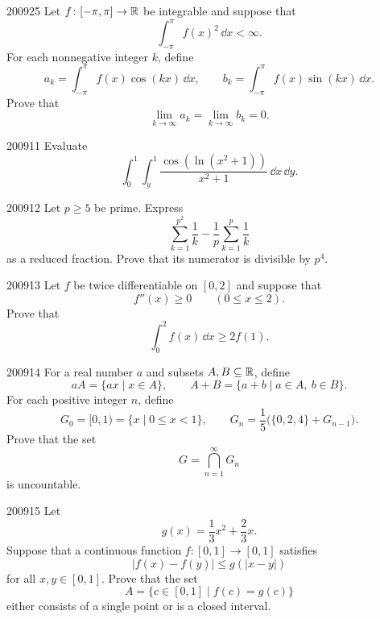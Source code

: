 \begin{problem}{2009}{2}{5}
Let $f\colon[-\pi, \pi]\to\mathbb{R}$ be integrable and suppose that
\[
    \int_{-\pi}^{\pi}f(x)^2\, \dd x<\infty.
\]
For each nonnegative integer $k$, define
\[
    a_k=\int_{-\pi}^{\pi}f(x)\cos(kx)\, \dd x,
    \qquad
    b_k=\int_{-\pi}^{\pi}f(x)\sin(kx)\, \dd x.
\]
Prove that
\[
    \lim_{k\to\infty}a_k
    =\lim_{k\to\infty}b_k
    =0.
\]
\end{problem}

\begin{problem}{2009}{1}{1}
Evaluate
\[
    \int_0^1\int_y^1
    \frac{\cos\!\left(\ln(x^2+1)\right)}{x^2+1}\, \dd x\, \dd y.
\]
\end{problem}

\begin{problem}{2009}{1}{2}
Let $p\ge5$ be prime. Express
\[
    \sum_{k=1}^{p^2}\frac1k
    -\frac1p\sum_{k=1}^{p}\frac1k
\]
as a reduced fraction. Prove that its numerator is divisible by $p^4$.
\end{problem}

\begin{problem}{2009}{1}{3}
Let $f$ be twice differentiable on $[0, 2]$ and suppose that
\[
    f''(x)\ge0
    \qquad(0\le x\le2).
\]
Prove that
\[
    \int_0^2 f(x)\, \dd x\ge2f(1).
\]
\end{problem}

\begin{problem}{2009}{1}{4}
For a real number $a$ and subsets $A, B\subseteq\mathbb{R}$, define
\[
    aA=\{ax\mid x\in A\},
    \qquad
    A+B=\{a+b\mid a\in A, \ b\in B\}.
\]
For each positive integer $n$, define
\[
    G_0=[0, 1)=\{x\mid0\le x<1\},
    \qquad
    G_n=\frac15\bigl(\{0, 2, 4\}+G_{n-1}\bigr).
\]
Prove that the set
\[
    G=\bigcap_{n=1}^{\infty}G_n
\]
is uncountable.
\end{problem}

\begin{problem}{2009}{1}{5}
Let
\[
    g(x)=\frac13x^2+\frac23x.
\]
Suppose that a continuous function $f\colon[0, 1]\to[0, 1]$ satisfies
\[
    |f(x)-f(y)|\le g(|x-y|)
\]
for all $x, y\in[0, 1]$. Prove that the set
\[
    A=\{c\in[0, 1]\mid f(c)=g(c)\}
\]
either consists of a single point or is a closed interval.
\end{problem}
